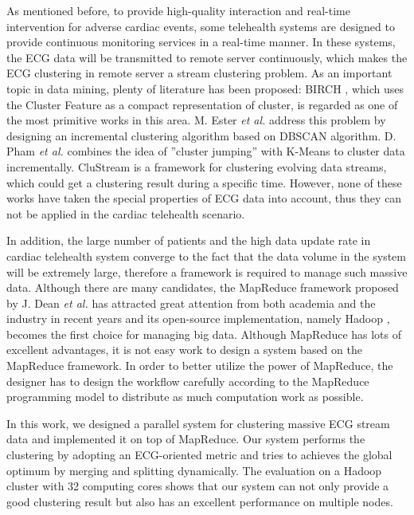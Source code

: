 \documentclass[conference]{IEEEtran}
\begin{document}
As mentioned before, to provide high-quality interaction and real-time intervention for adverse cardiac events, some telehealth systems are designed to provide continuous monitoring services in a real-time manner. In these systems, the ECG data will be transmitted to remote server continuously, which makes the ECG clustering in remote server a stream clustering problem. As an important topic in data mining, plenty of literature has been proposed: BIRCH \cite{Zhang:1996:BED:235968.233324}, which uses the Cluster Feature as a compact representation of cluster, is regarded as one of the most primitive works in this area. M. Ester \textit{et al.} \cite{Ester:1998:ICM:645924.671201} address this problem by designing an incremental clustering algorithm based on DBSCAN algorithm. D. Pham \textit{et al.} \cite{pham2004incremental} combines the idea of ''cluster jumping'' with K-Means to cluster data incrementally. CluStream \cite{aggarwal2003framework} is a framework for clustering evolving data streams, which could get a clustering result during a specific time. However, none of these works have taken the special properties of ECG data into account, thus they can not be applied in the cardiac telehealth scenario. 


In addition, the large number of patients and the high data update rate in cardiac telehealth system converge to the fact that the data volume in the system will be extremely large, therefore a framework is required to manage such massive data. Although there are many candidates, the MapReduce framework  proposed by J. Dean \textit{et al.} \cite{dean2008mapreduce} has attracted great attention from both academia and the industry in recent years and its open-source implementation, namely Hadoop \cite{white2010hadoop}, becomes the first choice for managing big data. Although MapReduce has lots of excellent advantages, it is not easy work to design a system based on the MapReduce framework. In order to better utilize the power of MapReduce, the designer has to design the workflow carefully according to the MapReduce programming model to distribute as much computation work as possible.


In this work, we designed a parallel system for clustering massive ECG stream data and implemented it on top of MapReduce. Our system performs the clustering by adopting an ECG-oriented metric and tries to achieves the global optimum by merging and splitting dynamically. The evaluation on a Hadoop cluster with 32 computing cores shows that our system can not only provide a good clustering result but also has an excellent performance on multiple nodes.
\end{document}
